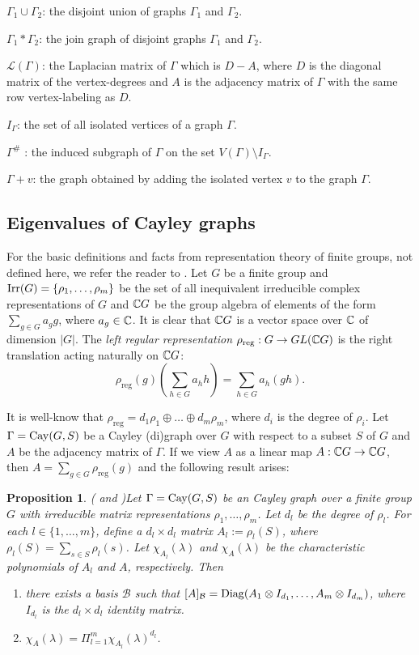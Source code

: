 \documentclass[12pt,a4paper]{article}
\newtheorem{proposition}{\bf Proposition}
\newcommand{\Cay}{{\rm Cay}}
\newcommand{\Irr}{{\rm Irr}}
\begin{document}
$\Gamma_1\cup\Gamma_2$: the disjoint union of graphs $\Gamma_1$ and $\Gamma_2$.

$\Gamma_1*\Gamma_2$: the join graph of disjoint graphs $\Gamma_1$ and $\Gamma_2$.

$\mathcal{L}(\Gamma)$: the Laplacian matrix of $\Gamma$ which is $D-A$, where $D$ is the diagonal matrix of the vertex-degrees and $A$ is the adjacency matrix of $\Gamma$ with the same row vertex-labeling as $D$.   

$I_\Gamma$: the set of all isolated vertices of a graph $\Gamma$.

$\Gamma^\#$ : the induced subgraph of $\Gamma$ on the set $V(\Gamma)\setminus I_\Gamma$.

$\Gamma+v$: the graph obtained by adding the isolated vertex $v$ to the graph $\Gamma$.

\subsection{Eigenvalues of Cayley graphs}

For the basic definitions and facts from representation theory of finite groups, not defined here, we refer the reader to \cite{Serre}. Let $G$ be a finite group and $\Irr(G)=\{\rho_1,\ldots,\rho_m\}$ be the set of all inequivalent irreducible complex representations of $G$ and $\Bbb CG$ be the group algebra of elements of the form $\sum_{g\in G}a_g g$, where $a_g\in\Bbb C$.
It is clear that $\Bbb CG$ is a vector space over $\Bbb C$ of dimension $|G|$. The \textit{left regular representation} $\rho_{\textrm{reg}}:G\rightarrow GL(\Bbb CG)$ is the right translation acting naturally on $\Bbb CG$:
\[\rho_{\textrm{reg}}(g)(\sum_{h\in G}a_h h)=\sum_{h\in G}a_h(gh).\]

It is well-know that $\rho_{\textrm{reg}}=d_1\rho_1\oplus\dots\oplus d_m\rho_m$, where $d_i$ is the degree of $\rho_i$.  Let $\Gamma=\Cay(G,S)$ be a Cayley (di)graph over $G$ with respect to a subset $S$ of $G$ and $A$ be the adjacency matrix of $\Gamma$. If we view $A$ as a linear map $A:\Bbb CG\rightarrow\Bbb CG$, then $A=\sum_{g\in G} \rho_{\textrm{reg}}(g)$ and the following result arises:

\begin{proposition}{\rm (\cite[Corollary 7]{AT} and \cite{DS})}\label{at}
Let $\Gamma={\rm Cay}(G,S)$ be an Cayley  graph over a
finite group $G$ with irreducible matrix representations $\rho_1,\ldots,\rho_m$.
Let $d_l$ be the degree of $\rho_l$. For each $l\in\{1,\ldots,m\}$, define a
$d_l\times d_l$  matrix $A_l:=\rho_l(S)$, where $\rho_l(S)=\sum_{s\in S}\rho_l(s)$. Let
$\chi_{A_l}(\lambda)$ and $\chi_{A}(\lambda)$ be the
characteristic polynomials of $A_l$ and $A$, respectively. Then
\begin{enumerate}
\item[(1)] there exists a basis $\mathcal{B}$ such that
$[A]_{\mathcal{B}}={\rm Diag}(A_1\otimes I_{d_1},\ldots,A_m\otimes I_{d_m})$, where $I_{d_l}$ is the $d_l \times d_l$ identity matrix.
\item[(2)]$\chi_A(\lambda)=\Pi_{l=1}^{m}\chi_{A_l}(\lambda)^{d_l}$.
\end{enumerate}
\end{proposition}
\end{document}
